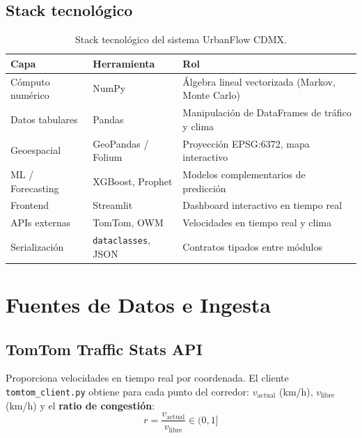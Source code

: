 \documentclass[12pt, a4paper]{article}
\theoremstyle{definition}
\begin{document}
\subsection{Stack tecnológico}

\begin{table}[h!]
\centering
\renewcommand{\arraystretch}{1.3}
\begin{tabularx}{\textwidth}{llX}
\toprule
\textbf{Capa} & \textbf{Herramienta} & \textbf{Rol} \\
\midrule
Cómputo numérico & NumPy & Álgebra lineal vectorizada (Markov, Monte Carlo) \\
Datos tabulares  & Pandas & Manipulación de DataFrames de tráfico y clima \\
Geoespacial      & GeoPandas / Folium & Proyección EPSG:6372, mapa interactivo \\
ML / Forecasting & XGBoost, Prophet & Modelos complementarios de predicción \\
Frontend         & Streamlit & Dashboard interactivo en tiempo real \\
APIs externas    & TomTom, OWM & Velocidades en tiempo real y clima \\
Serialización    & \texttt{dataclasses}, JSON & Contratos tipados entre módulos \\
\bottomrule
\end{tabularx}
\caption{Stack tecnológico del sistema UrbanFlow CDMX.}
\end{table}

\section{Fuentes de Datos e Ingesta}

\subsection{TomTom Traffic Stats API}

Proporciona velocidades en tiempo real por coordenada. El cliente
\texttt{tomtom\_client.py} obtiene para cada punto del corredor:
$v_\text{actual}$ (km/h), $v_\text{libre}$ (km/h) y el
\textbf{ratio de congestión}:
\begin{equation}
    r = \frac{v_\text{actual}}{v_\text{libre}} \in (0, 1]
    \label{eq:ratio}
\end{equation}
\end{document}

